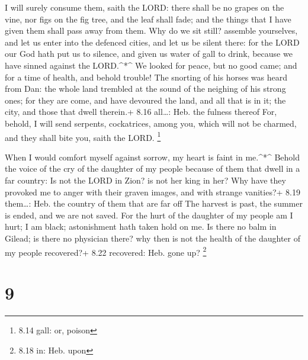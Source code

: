  I will surely consume them, saith the LORD: there shall be
no grapes on the vine, nor figs on the fig tree, and the leaf shall
fade; and the things that I have given them shall pass away from them.
 Why do we sit still? assemble yourselves, and let us enter
into the defenced cities, and let us be silent there: for the LORD our
God hath put us to silence, and given us water of gall to drink, because
we have sinned against the LORD.\^{}*\^{}  We looked for
peace, but no good came; and for a time of health, and behold trouble!
 The snorting of his horses was heard from Dan: the whole
land trembled at the sound of the neighing of his strong ones; for they
are come, and have devoured the land, and all that is in it; the city,
and those that dwell therein.+ 8.16 all\ldots: Heb. the fulness thereof
 For, behold, I will send serpents, cockatrices, among you,
which will not be charmed, and they shall bite you, saith the LORD.
\footnote{8.14 gall: or, poison}

 When I would comfort myself against sorrow, my heart is
faint in me.\^{}*\^{}  Behold the voice of the cry of the
daughter of my people because of them that dwell in a far country: Is
not the LORD in Zion? is not her king in her? Why have they provoked me
to anger with their graven images, and with strange vanities?+ 8.19
them\ldots: Heb. the country of them that are far off  The
harvest is past, the summer is ended, and we are not saved.
 For the hurt of the daughter of my people am I hurt; I am
black; astonishment hath taken hold on me.  Is there no
balm in Gilead; is there no physician there? why then is not the health
of the daughter of my people recovered?+ 8.22 recovered: Heb. gone up?
\footnote{8.18 in: Heb. upon}

\hypertarget{section-8}{%
\section{9}\label{section-8}}

